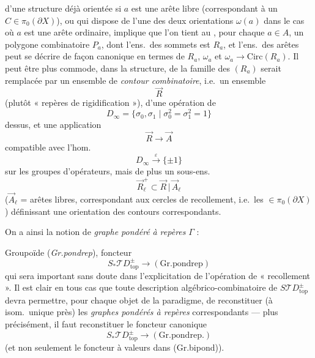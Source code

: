 \documentclass[11pt,a4paper]{article}
\begin{document}
d'une structure déjà orientée si $a$ est une arête libre (correspondant à
un $C \in \pi_0(\partial X)$), ou qui dispose de l'une des deux orientations
$\omega(a)$ dans le cas où $a$ est une arête ordinaire, implique que l'on
tient au , pour chaque $a \in A$, un polygone combinatoire
$P_a$, dont l'ens.\ des sommets est $R_a$, et l'ens.\ des arêtes peut se
décrire \struck{\ill{}} de façon canonique en termes de $R_a$, $\omega_a$ et
$\omega_a \to \mathrm{Circ}(R_a)$. Il peut être plus commode, \ill{}
\ill{}  dans la structure, de \ill{} \ill{} \ill{}
la famille des $(R_a)$ serait remplacée par un  ensemble de \emph{contour combinatoire}, i.e.\ un ensemble \ill{}
\[
\vec{R}
\]
(plutôt « repères de rigidification »), \ill{} d'une opération de
\[
D_{\infty} = \lbrace \sigma_0, \sigma_1 \mid \sigma_0^2 = \sigma_1^2 = 1 \rbrace
\]
dessus, et une application
\[
\vec{R} \longrightarrow \vec{A}
\]
compatible avec l'hom.
\[
D_{\infty} \xrightarrow{\ \varepsilon\ } \lbrace \pm 1 \rbrace
\]
sur les groupes d'opérateurs, mais de plus un sous-ens.
\[
\vec{R}^{+}_{\ell} \subset \vec{R}\,|\,\vec{A}_{\ell}
\]
($\vec{A}_{\ell}$ = arêtes libres, correspondant aux cercles de
recollement, i.e.\ les $\in \pi_0(\partial X)$) définissant une orientation
des contours correspondants.

On a ainsi la notion de \emph{graphe pondéré} \emph{à repères}
 $\Gamma$ :



Groupoïde (\emph{Gr.pondrep}), foncteur
\[
S_{*}\mathcal{T}D^{\pm}_{\mathrm{top}} \longrightarrow (\mathrm{Gr.pondrep})
\]
qui sera important sans doute dans l'explicitation de l'opération de
« recollement ». Il est clair en tous cas que toute description
algébrico-combinatoire de $S\mathcal{T}D^{\pm}_{\mathrm{top}}$ devra
permettre, pour chaque objet de la  
paradigme, de reconstituer (à isom.\ unique près) les \emph{graphes pondérés
à repères} correspondants --- plus précisément, il faut reconstituer le
foncteur canonique
\[
S_{*}\mathcal{T}D^{\pm}_{\mathrm{top}} \longrightarrow (\mathrm{Gr.pondrep.})
\]
(et non seulement le foncteur à valeurs dans (Gr.bipond)).
\end{document}
